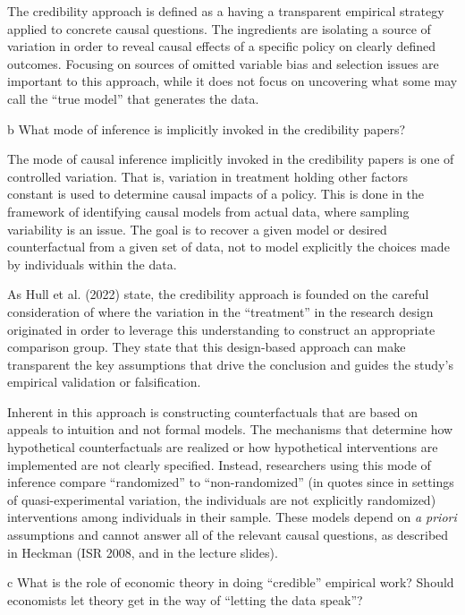 \documentclass{article}
\begin{document}
The credibility approach is defined as a having a transparent empirical strategy applied to concrete causal questions. The ingredients are isolating a source of variation in order to reveal causal effects of a specific policy on clearly defined outcomes. Focusing on sources of omitted variable bias and selection issues are important to this approach, while it does not focus on uncovering what some may call the ``true model'' that generates the data. 

\begin{problem}{b}
What mode of inference is implicitly invoked in the credibility papers?
\end{problem}

The mode of causal inference implicitly invoked in the credibility papers is one of controlled variation. That is, variation in treatment holding other factors constant is used to determine causal impacts of a policy. This is done in the framework of identifying causal models from actual data, where sampling variability is an issue. The goal is to recover a given model or desired counterfactual from a given set of data, not to model explicitly the choices made by individuals within the data. 

As Hull et al. (2022) state, the credibility approach is founded on the careful consideration of where the variation in the ``treatment'' in the research design originated in order to leverage this understanding to construct an appropriate comparison group. They state that this design-based approach can make transparent the key assumptions that drive the conclusion and guides the study's empirical validation or falsification.


Inherent in this approach is constructing counterfactuals that are based on appeals to intuition and not formal models. The mechanisms that determine how hypothetical counterfactuals are realized or how hypothetical interventions are implemented are not clearly specified. Instead, researchers using this mode of inference compare ``randomized'' to ``non-randomized'' (in quotes since in settings of quasi-experimental variation, the individuals are not explicitly randomized) interventions among individuals in their sample. These models depend on \textit{a priori} assumptions and cannot answer all of the relevant causal questions, as described in Heckman (ISR 2008, and in the lecture slides).


\begin{problem}{c}
What is the role of economic theory in doing “credible” empirical work? Should economists let theory get in the way of “letting the data speak”?
\end{problem}
\end{document}
